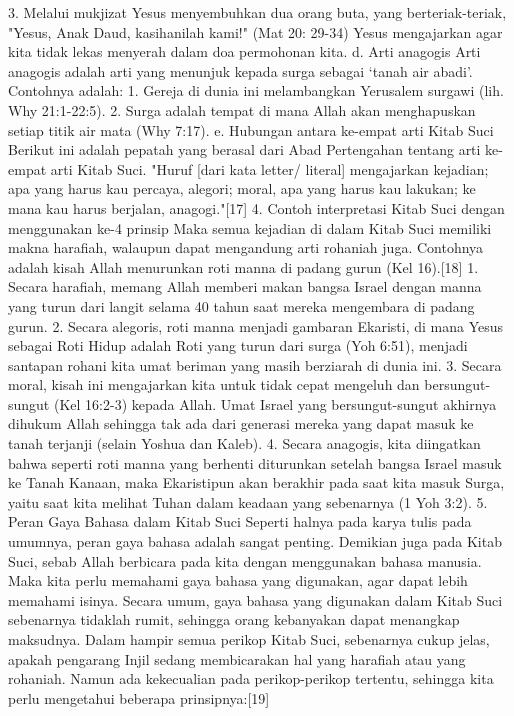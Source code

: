 3.    Melalui mukjizat Yesus menyembuhkan dua orang buta, yang berteriak-teriak, "Yesus, Anak Daud, kasihanilah kami!" (Mat 20: 29-34) Yesus mengajarkan agar kita tidak lekas menyerah dalam doa permohonan kita.
d. Arti anagogis
Arti anagogis adalah arti yang menunjuk kepada surga sebagai ‘tanah air abadi’. Contohnya adalah:
1.    Gereja di dunia ini melambangkan Yerusalem surgawi (lih. Why 21:1-22:5).
2.    Surga adalah tempat di mana Allah akan menghapuskan setiap titik air mata (Why 7:17).
e. Hubungan antara ke-empat arti Kitab Suci
Berikut ini adalah pepatah yang berasal dari Abad Pertengahan tentang arti ke-empat arti Kitab Suci. "Huruf [dari kata letter/ literal] mengajarkan kejadian; apa yang harus kau percaya, alegori; moral, apa yang harus kau lakukan; ke mana kau harus berjalan, anagogi."[17]
4. Contoh interpretasi Kitab Suci dengan menggunakan ke-4 prinsip
Maka semua kejadian di dalam Kitab Suci memiliki makna harafiah, walaupun dapat mengandung arti rohaniah juga. Contohnya adalah kisah Allah menurunkan roti manna di padang gurun (Kel 16).[18]
1.    Secara harafiah, memang Allah memberi makan bangsa Israel dengan manna yang turun dari langit selama 40 tahun saat mereka mengembara di padang gurun.
2.    Secara alegoris, roti manna menjadi gambaran Ekaristi, di mana Yesus sebagai Roti Hidup adalah Roti yang turun dari surga (Yoh 6:51), menjadi santapan rohani kita umat beriman yang masih berziarah di dunia ini.
3.    Secara moral, kisah ini mengajarkan kita untuk tidak cepat mengeluh dan bersungut-sungut (Kel 16:2-3) kepada Allah. Umat Israel yang bersungut-sungut akhirnya dihukum Allah sehingga tak ada dari generasi mereka yang dapat masuk ke tanah terjanji (selain Yoshua dan Kaleb).
4.    Secara anagogis, kita diingatkan bahwa seperti roti manna yang berhenti diturunkan setelah bangsa Israel masuk ke Tanah Kanaan, maka Ekaristipun akan berakhir pada saat kita masuk Surga, yaitu saat kita melihat Tuhan dalam keadaan yang sebenarnya (1 Yoh 3:2).
5. Peran Gaya Bahasa dalam Kitab Suci
Seperti halnya pada karya tulis pada umumnya, peran gaya bahasa adalah sangat penting. Demikian juga pada Kitab Suci, sebab Allah berbicara pada kita dengan menggunakan bahasa manusia. Maka kita perlu memahami gaya bahasa yang digunakan, agar dapat lebih memahami isinya. Secara umum, gaya bahasa yang digunakan dalam Kitab Suci sebenarnya tidaklah rumit, sehingga orang kebanyakan dapat menangkap maksudnya. Dalam hampir semua perikop Kitab Suci, sebenarnya cukup jelas, apakah pengarang Injil sedang membicarakan hal yang harafiah atau yang rohaniah. Namun ada kekecualian pada perikop-perikop tertentu, sehingga kita perlu mengetahui beberapa prinsipnya:[19]
